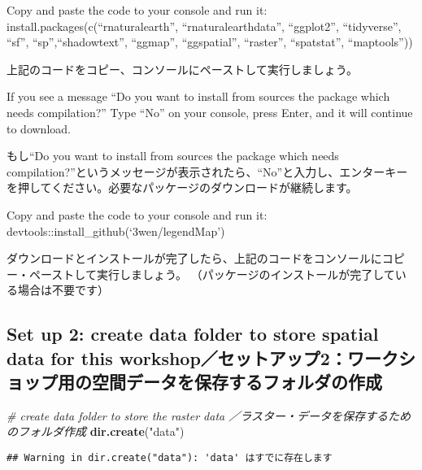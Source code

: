 \documentclass[
  xelatex,ja=standard]{bxjsarticle}
\newenvironment{Shaded}{\begin{snugshade}}{\end{snugshade}}
\newcommand{\CommentTok}[1]{\textcolor[rgb]{0.56,0.35,0.01}{\textit{#1}}}
\newcommand{\KeywordTok}[1]{\textcolor[rgb]{0.13,0.29,0.53}{\textbf{#1}}}
\newcommand{\NormalTok}[1]{#1}
\newcommand{\StringTok}[1]{\textcolor[rgb]{0.31,0.60,0.02}{#1}}
\begin{document}
Copy and paste the code to your console and run it:
install.packages(c(``rnaturalearth'', ``rnaturalearthdata'',
``ggplot2'', ``tidyverse'', ``sf'', ``sp'',``shadowtext'', ``ggmap'',
``ggspatial'', ``raster'', ``spatstat'', ``maptools''))

上記のコードをコピー、コンソールにペーストして実行しましょう。

If you see a message ``Do you want to install from sources the package
which needs compilation?'' Type ``No'' on your console, press Enter, and
it will continue to download.

もし``Do you want to install from sources the package which needs
compilation?''というメッセージが表示されたら、``No''と入力し、エンターキーを押してください。必要なパッケージのダウンロードが継続します。

Copy and paste the code to your console and run it:
devtools::install\_github(`3wen/legendMap')

ダウンロードとインストールが完了したら、上記のコードをコンソールにコピー・ペーストして実行しましょう。
（パッケージのインストールが完了している場合は不要です）

\hypertarget{set-up-2-create-data-folder-to-store-spatial-data-for-this-workshopux30bbux30c3ux30c8ux30a2ux30c3ux30d72ux30efux30fcux30afux30b7ux30e7ux30c3ux30d7ux7528ux306eux7a7aux9593ux30c7ux30fcux30bfux3092ux4fddux5b58ux3059ux308bux30d5ux30a9ux30ebux30c0ux306eux4f5cux6210}{%
\subsection{Set up 2: create data folder to store spatial data for this
workshop／セットアップ2：ワークショップ用の空間データを保存するフォルダの作成}\label{set-up-2-create-data-folder-to-store-spatial-data-for-this-workshopux30bbux30c3ux30c8ux30a2ux30c3ux30d72ux30efux30fcux30afux30b7ux30e7ux30c3ux30d7ux7528ux306eux7a7aux9593ux30c7ux30fcux30bfux3092ux4fddux5b58ux3059ux308bux30d5ux30a9ux30ebux30c0ux306eux4f5cux6210}}

\begin{Shaded}
\begin{Highlighting}[]
\CommentTok{# create data folder to store the raster data ／ラスター・データを保存するためのフォルダ作成}
\KeywordTok{dir.create}\NormalTok{(}\StringTok{"data"}\NormalTok{)}
\end{Highlighting}
\end{Shaded}

\begin{verbatim}
## Warning in dir.create("data"): 'data' はすでに存在します
\end{verbatim}
\end{document}
